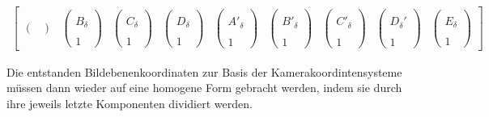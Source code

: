 \begin{gather}
\begin{bmatrix}
\begin{pmatrix}
\end{pmatrix}&
\begin{pmatrix}
\\B_\delta\\\\1
\end{pmatrix}&
\begin{pmatrix}
\\C_\delta\\\\1
\end{pmatrix}&
\begin{pmatrix}
\\D_\delta\\\\1
\end{pmatrix}&
\begin{pmatrix}
\\A'_\delta\\\\1
\end{pmatrix}&
\begin{pmatrix}
\\B'_\delta\\\\1
\end{pmatrix}&
\begin{pmatrix}
\\C'_\delta\\\\1
\end{pmatrix}&
\begin{pmatrix}
\\D_\delta'\\\\1
\end{pmatrix}&
\begin{pmatrix}
\\E_\delta\\\\1
\end{pmatrix}
\end{bmatrix}
\end{gather}

Die entstanden Bildebenenkoordinaten zur Basis der Kamerakoordintensysteme müssen dann wieder auf eine homogene Form gebracht werden, indem sie durch ihre jeweils letzte Komponenten dividiert werden. 


